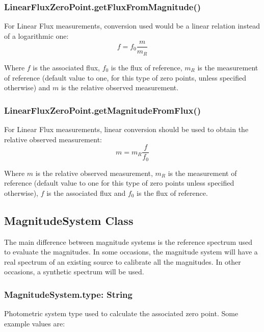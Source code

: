 \documentclass[11pt,a4paper]{ivoa}
\begin{document}
\subsubsection{LinearFluxZeroPoint.getFluxFromMagnitude()}
For Linear Flux measurements, conversion used would be a linear
relation instead of a logarithmic one:
\begin{equation} \label{eq:29}
f = f_0\frac{m}{m_R}
\end{equation}

Where $f$ is the associated flux, $f_0$ is the flux of reference, $m_R$ is
the measurement of reference (default value to one, for this type of zero
points, unless specified otherwise) and $m$ is the relative observed
measurement.
\par

\subsubsection{LinearFluxZeroPoint.getMagnitudeFromFlux()}
For Linear Flux measurements, linear conversion should be used to obtain
the relative observed measurement:
\begin{equation} \label{eq:30}
m = m_R \frac{f}{f_0}
\end{equation}

Where $m$ is the relative observed measurement, $m_R$ is the measurement
of reference (default value to one for this type of zero points unless
specified otherwise), $f$ is the associated flux and $f_0$ is the flux
of reference.\par

\subsection{MagnitudeSystem Class}
The main difference between magnitude systems is the reference spectrum
used to evaluate the magnitudes. In some occasions, the magnitude system
will have a real spectrum of an existing source to calibrate all the magnitudes.
In other occasions, a synthetic spectrum will be used.
\par

\subsubsection{MagnitudeSystem.type: String}
Photometric system type used to calculate the associated zero point.
Some example values are:
\par
\end{document}
